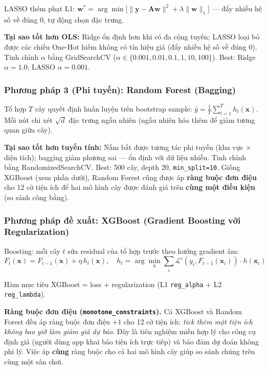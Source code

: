 LASSO thêm phạt L1:
$\mathbf{w}^* = \arg\min\bigl[\|\mathbf{y}-\mathbf{A}\mathbf{w}\|^2 + \lambda\|\mathbf{w}\|_1\bigr]$
— đẩy nhiều hệ số về đúng 0, tự động chọn đặc trưng.

\textbf{Tại sao tốt hơn OLS:}
Ridge ổn định hơn khi có đa cộng tuyến; LASSO loại bỏ được các chiều One-Hot
hiếm không có tín hiệu giá (đẩy nhiều hệ số về đúng 0).
Tinh chỉnh $\alpha$ bằng GridSearchCV ($\alpha \in \{0.001, 0.01, 0.1, 1, 10, 100\}$).
Best: Ridge $\alpha = 1.0$; LASSO $\alpha = 0.001$.

\subsubsection*{Phương pháp 3 (Phi tuyến): Random Forest (Bagging)}

Tổ hợp $T$ cây quyết định huấn luyện trên bootstrap sample:
$\hat{y} = \frac{1}{T}\sum_{t=1}^{T}h_t(\mathbf{x})$.
Mỗi nút chỉ xét $\sqrt{d}$ đặc trưng ngẫu nhiên (ngẫu nhiên hóa thêm để giảm tương quan giữa cây).

\textbf{Tại sao tốt hơn tuyến tính:}
Nắm bắt được tương tác phi tuyến (khu vực × diện tích);
bagging giảm phương sai — ổn định với dữ liệu nhiễu.
Tinh chỉnh bằng RandomizedSearchCV.
Best: 500 cây, depth 20, \texttt{min\_split=10}.
Giống XGBoost (xem phần dưới), Random Forest cũng được áp \textbf{ràng buộc đơn điệu} cho 12 cờ
tiện ích để hai mô hình cây được đánh giá trên \textbf{cùng một điều kiện} (so sánh công bằng).

\subsubsection*{Phương pháp đề xuất: XGBoost (Gradient Boosting với Regularization)}

Boosting: mỗi cây $t$ sửa residual của tổ hợp trước theo hướng gradient âm:
\[
  F_t(\mathbf{x}) = F_{t-1}(\mathbf{x}) + \eta\, h_t(\mathbf{x}),
  \quad h_t = \arg\min_h \sum_i \mathcal{L}'(y_i, F_{t-1}(\mathbf{x}_i))\cdot h(\mathbf{x}_i)
\]

Hàm mục tiêu XGBoost = loss + regularization (L1 \texttt{reg\_alpha} + L2 \texttt{reg\_lambda}).

\textbf{Ràng buộc đơn điệu (\texttt{monotone\_constraints}).} Cả XGBoost và Random Forest đều áp
ràng buộc đơn điệu $+1$ cho 12 cờ tiện ích: \textit{tick thêm một tiện ích không bao giờ làm giảm
giá dự báo}. Đây là tiên nghiệm miền hợp lý cho công cụ định giá (người dùng app khai báo tiện ích
trực tiếp) và bảo đảm dự đoán không phi lý. Việc áp \textbf{cùng} ràng buộc cho cả hai mô hình cây
giúp so sánh chúng trên cùng một sân chơi.

